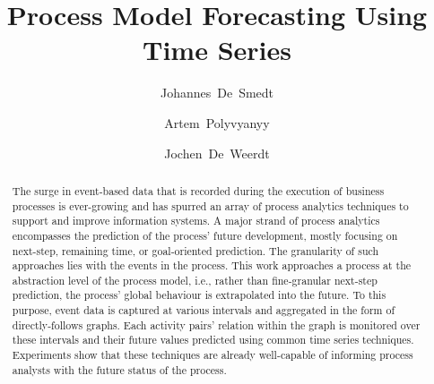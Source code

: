 \documentclass{svproc}
\begin{document}
\mainmatter      
%
\title{Process Model Forecasting Using Time Series}
%
%
\author{Johannes~De~Smedt \and Artem~Polyvyanyy \and Jochen~De~Weerdt}
%
%
\maketitle              

\begin{abstract}
The surge in event-based data that is recorded during the execution of business processes is ever-growing and has spurred an array of process analytics techniques to support and improve information systems.
A major strand of process analytics encompasses the prediction of the process' future development, mostly focusing on next-step, remaining time, or goal-oriented prediction.
The granularity of such approaches lies with the events in the process.
This work approaches a process at the abstraction level of the process model, i.e., rather than fine-granular next-step prediction, the process' global behaviour is extrapolated into the future.
To this purpose, event data is captured at various intervals and aggregated in the form of directly-follows graphs.
Each activity pairs' relation within the graph is monitored over these intervals and their future values predicted using common time series techniques.
Experiments show that these techniques are already well-capable of informing process analysts with the future status of the process.
\end{abstract}
%




%
%



\end{document}
